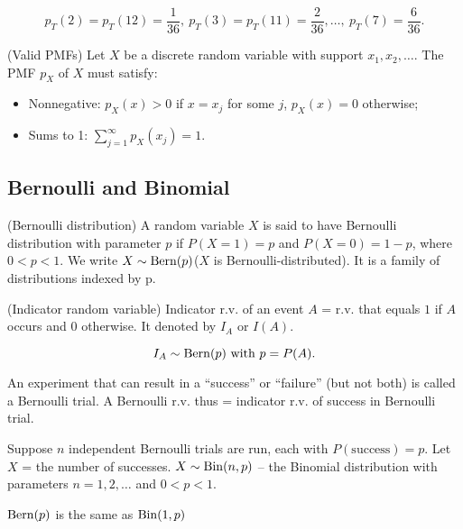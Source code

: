 \[
    p_T(2) = p_{T}(12) = \dfrac{1}{36}, \ p_T(3) = p_{T}(11) = \dfrac{2}{36}, \ldots, \ p_T(7) = \dfrac{6}{36}.  
\]
\begin{theorema}{(Valid PMFs)}{}
    Let $X$ be a discrete random variable with support $x_1, x_2, \ldots$. The PMF $p_X$ of $X$ must satisfy:
    \begin{itemize}
        \item Nonnegative: $p_X(x) > 0$ if $x = x_j$ for some $j$, $p_X(x) = 0$ otherwise;
        \item Sums to 1: $\sum\limits_{j=1}^\infty p_X(x_j) = 1$. 
    \end{itemize}
\end{theorema}
\subsection*{Bernoulli and Binomial}
\begin{definition}{(Bernoulli distribution)}{}
    A random variable $X$ is said to have Bernoulli distribution with parameter $p$ if $P(X = 1) = p$ and $P(X=0) = 1-p$, where $0 < p < 1$. We write $X \sim \operatorname{Bern}(p)$($X$ is Bernoulli-distributed). It is a family of distributions indexed by p.  
\end{definition}

\begin{definition}{(Indicator random variable)}{}
    Indicator r.v. of an event $A$ = r.v. that equals $1$ if $A$ occurs and $0$ otherwise. It denoted by $I_A$ or $I(A)$.
\end{definition}
\begin{note}{}{}
    \[
        I_A \sim \operatorname{Bern}(p) \text{ with } p = P(A).  
    \]
\end{note}
\par 
An experiment that can result in a ``success'' or ``failure'' (but not both) is called a Bernoulli trial. A Bernoulli r.v. thus = indicator r.v. of success in Bernoulli trial.

\par
Suppose $n$ independent Bernoulli trials are run, each with $P(\text{success}) = p$. Let $X$ = the number of successes. $X \sim \operatorname{Bin}(n, p)$ -- the Binomial distribution with parameters $n = 1, 2, \ldots$ and $0 < p < 1$.

\begin{note}{}{}
    $\operatorname{Bern}(p)$ is the same as $\operatorname{Bin}(1, p)$
\end{note}

